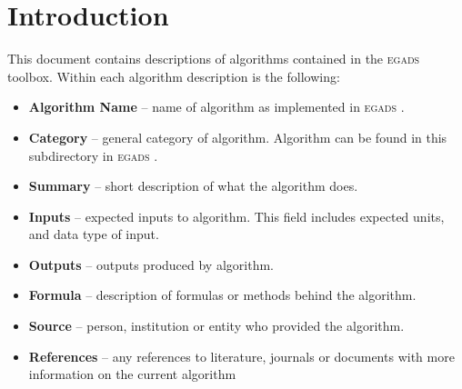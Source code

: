 \documentclass[a4paper,11pt]{report}
\newcommand{\egads}{\textsc{egads} }
\begin{document}
\renewcommand{\thepage}{\roman{page}}




\tableofcontents
\pagebreak


\renewcommand{\thepage}{\arabic{page}}
\setcounter{page}{1}


\chapter{Introduction}

This document contains descriptions of algorithms contained in the \egads toolbox. Within each algorithm description is the following:

\begin{itemize}
\item \textbf{Algorithm Name} -- name of algorithm as implemented in \egads.
\item \textbf{Category} -- general category of algorithm. Algorithm can be found in this subdirectory in \egads.
\item \textbf{Summary} -- short description of what the algorithm does.
\item \textbf{Inputs} -- expected inputs to algorithm. This field includes expected units, and data type of input.
\item \textbf{Outputs} -- outputs produced by algorithm.
\item \textbf{Formula} -- description of formulas or methods behind the algorithm.
\item \textbf{Source} -- person, institution or entity who provided the algorithm.
\item \textbf{References} -- any references to literature, journals or documents with more information on the current algorithm
\end{itemize}
\end{document}
